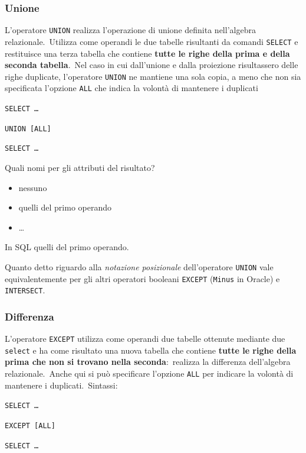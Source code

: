 \subsubsection{Unione}

L'operatore \texttt{UNION} realizza l'operazione di unione definita nell'algebra relazionale.\
Utilizza come operandi le due tabelle risultanti da comandi \texttt{SELECT} e restituisce una terza tabella che contiene \textbf{tutte le righe della prima e della seconda tabella}.\
Nel caso in cui dall'unione e dalla proiezione risultassero delle righe duplicate, l'operatore \texttt{UNION} ne mantiene una sola copia, a meno che non sia specificata l'opzione \texttt{ALL} che indica la volontà di mantenere i duplicati
\begin{flushleft}
	\texttt{SELECT\ \dots}

	\texttt{UNION [ALL]}

	\texttt{SELECT\ \dots}
\end{flushleft}

\noindent Quali nomi per gli attributi del risultato?
\begin{itemize}
	\item nessuno
	\item quelli del primo operando
	\item \dots
\end{itemize}
In SQL quelli del primo operando.

Quanto detto riguardo alla \textit{notazione posizionale} dell'operatore \texttt{UNION} vale equivalentemente per gli altri operatori booleani \texttt{EXCEPT} (\texttt{Minus} in Oracle) e \texttt{INTERSECT}.

\subsubsection{Differenza}

L'operatore \texttt{EXCEPT} utilizza come operandi due tabelle ottenute mediante due \texttt{select} e ha come risultato una nuova tabella che contiene \textbf{tutte le righe della prima che non si trovano nella seconda}:\ realizza la differenza dell'algebra relazionale.\
Anche qui si può specificare l'opzione \texttt{ALL} per indicare la volontà di mantenere i duplicati.\
Sintassi:

\begin{flushleft}
	\texttt{SELECT\ \dots}

	\texttt{EXCEPT [ALL]}

	\texttt{SELECT\ \dots}
\end{flushleft}

